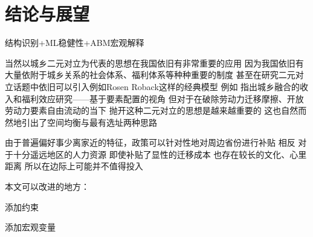 \documentclass[
  a4paper,
  zihao=-4,
  fontset=mac,
  AutoFakeBold,
  AutoFakeSlant,
  oneside]{ctexbook}
\begin{document}






\chapter{结论与展望}

结构识别+ML稳健性+ABM宏观解释


当然以城乡二元对立为代表的思想在我国依旧有非常重要的应用 因为我国依旧有大量依附于城乡关系的社会体系、福利体系等种种重要的制度
甚至在研究二元对立话题中依旧可以引入例如Rosen Roback这样的经典模型
例如 
\textcite{GuoDongMeiChengXiangRongHeDeShouRuHeFuLiXiaoYingYanJiuJiYuYaoSuPeiZhiDeShiJiao2023}指出城乡融合的收入和福利效应研究——基于要素配置的视角
但对于在破除劳动力迁移摩擦、开放劳动力要素自由流动的当下
抛开这种二元对立的思想是越来越重要的
这也自然而然地引出了空间均衡与最有选址两种思路



由于普遍偏好事少离家近的特征，政策可以针对性地对周边省份进行补贴
相反 对于十分遥远地区的人力资源 即使补贴了显性的迁移成本 也存在较长的文化、心里距离 所以在边际上可能并不值得投入



本文可以改进的地方：

添加约束

添加宏观变量
\end{document}
